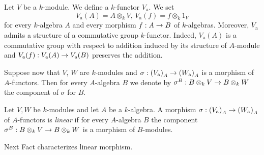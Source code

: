 \begin{example}\label{example:additivekfunctor}
Let $V$ be a $k$-module. We define a $k$-functor $V_{\mathrm{a}}$. We set
$$V_{\mathrm{a}}(A) = A\otimes_kV,\,V_{\mathrm{a}}(f) = f\otimes_k1_V$$
for every $k$-algebra $A$ and every morphism $f:A\rightarrow B$ of $k$-algebras. Moreover, $V_{\mathrm{a}}$ admits a structure of a commutative group $k$-functor. Indeed, $V_{\mathrm{a}}(A)$ is a commutative group with respect to addition induced by its structure of $A$-module and $V_{\mathrm{a}}(f):V_{\mathrm{a}}(A)\rightarrow V_{\mathrm{a}}(B)$ preserves the addition.
\end{example}
\noindent
Suppose now that $V$, $W$ are $k$-modules and $\sigma:\left(V_{\mathrm{a}}\right)_A\rightarrow \left(W_{\mathrm{a}}\right)_A$ is a morphism of $A$-functors. Then for every $A$-algebra $B$ we denote by $\sigma^B:B\otimes_kV\rightarrow B\otimes_kW$ the component of $\sigma$ for $B$.

\begin{definition}
Let $V,W$ be $k$-modules and let $A$ be a $k$-algebra. A morphism $\sigma:\left(V_{\mathrm{a}}\right)_A\rightarrow \left(W_{\mathrm{a}}\right)_A$ of $A$-functors is \textit{linear} if for every $A$-algebra $B$ the component $\sigma^B:B\otimes_kV\rightarrow B\otimes_kW$ is a morphism of $B$-modules.
\end{definition}
\noindent
Next Fact characterizes linear morphism.

